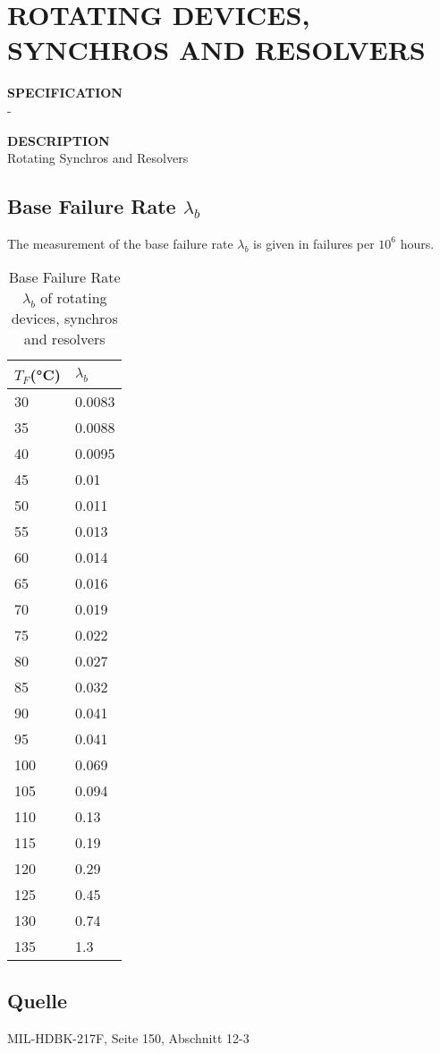 \section{ROTATING DEVICES, SYNCHROS AND RESOLVERS}

\begin{minipage}[t]{0.29\textwidth}
    \textbf{SPECIFICATION}\\
    -
\end{minipage}
\begin{minipage}[t]{0.7\textwidth}
    \textbf{DESCRIPTION}\\
    Rotating Synchros and Resolvers
\end{minipage}

\subsection{Base Failure Rate $\lambda_b$}
The measurement of the base failure rate $\lambda_b$ is given in failures per $10^6$ hours.
\begin{table}[ht]
{\centering

\begin{tabular}{|p{1.5cm}|p{1.5cm}|}
    \hline
    \textbf{$T_F$(°C)} & \textbf{$\lambda_b$} \\
    \hline
    30 & 0.0083 \\
    \hline
    35 & 0.0088 \\
    \hline
    40 & 0.0095 \\
    \hline
    45 & 0.01 \\
    \hline
    50 & 0.011 \\
    \hline
    55 & 0.013 \\
    \hline
    60 & 0.014 \\
    \hline
    65 & 0.016 \\
    \hline
    70 & 0.019 \\
    \hline
    75 & 0.022 \\
    \hline
    80 & 0.027 \\
    \hline
    85 & 0.032 \\
    \hline
    90 & 0.041 \\
    \hline
    95 & 0.041 \\
    \hline
    100 & 0.069 \\
    \hline
    105 & 0.094 \\
    \hline
    110 & 0.13 \\
    \hline
    115 & 0.19 \\
    \hline
    120 & 0.29 \\
    \hline
    125 & 0.45 \\
    \hline
    130 & 0.74 \\
    \hline
    135 & 1.3 \\
    \hline
\end{tabular}

\caption{Base Failure Rate $\lambda_b$ of rotating devices, synchros and resolvers}

\label{tab:bfr_rotating_devices_synchros_and_resolvers}
\par}
\end{table}
\subsection*{Quelle}
MIL-HDBK-217F, Seite 150, Abschnitt 12-3